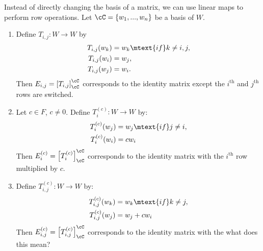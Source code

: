     \begin{example}
        Instead of directly changing the basis of a matrix, we can use linear maps to perform row operations. Let $\cC = \{w_1,...,w_n\}$ be a basis of $W$.
            \begin{enumerate}[label = (\arabic*)]
                \item Define $T_{i,j}: W \rightarrow W$ by
                    \begin{equation*}
                    \begin{split}
                        T_{i,j}(w_k) &= w_k \mtext{if} k \neq i,j, \\
                        T_{i,j}(w_i) &= w_j,\\
                        T_{i,j}(w_j) &= w_i.
                    \end{split}
                    \end{equation*}
                Then $E_{i,j} = \left[ T_{i,j} \right]_{\cC}^\cC$ corresponds to the identity matrix except the $i^{\text{th}}$ and $j^{\text{th}}$ rows are switched.

                \item Let $c \in F$, $c \neq 0$. Define $T_i^{(c)}: W \rightarrow W$ by:
                    \begin{equation*}
                    \begin{split}
                        T_i^{(c)}(w_j) &= w_j \mtext{if} j \neq i,\\
                        T_i^{(c)}(w_i) &= c w_i
                    \end{split}
                    \end{equation*}
                Then $E_i^{(c)} = \left[ T_i^{(c)} \right]_\cC ^ \cC$ corresponds to the identity matrix with the $i^\text{th}$ row multiplied by $c$.

                \item Define $T_{i,j}^{(c)}:W \rightarrow W$ by:
                    \begin{equation*}
                    \begin{split}
                        T_{i,j}^{(c)}(w_k) &= w_k \mtext{if} k \neq j,\\
                        T_{i,j}^{(c)}(w_j) &= w_j + cw_i
                    \end{split}
                    \end{equation*}
                Then $E_{i,j}^{(c)} = \left[ T_{i,j}^{(c)} \right]_\cC ^ \cC$ corresponds to the identity matrix with the {\color{red} what does this mean?}
            \end{enumerate}


\end{example}
